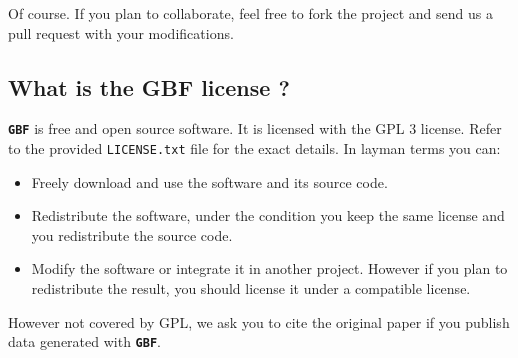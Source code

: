 \documentclass[10pt,a4paper]{article}
\begin{document}
Of course. If you plan to collaborate, feel free to fork the project
and send us a pull request with your modifications.

\subsection{What is the GBF license ?}
\label{sec-6-10}

\textbf{\texttt{\textsf{\color{namecolor}GBF}}} is free and open source software. It is licensed with the GPL 3
license. Refer to the provided \texttt{LICENSE.txt} file for the exact
details. In layman terms you can:

\begin{itemize}
\item Freely download and use the software and its source code.
\item Redistribute the software, under the condition you keep the same license and
you redistribute the source code.
\item Modify the software or integrate it in another project. However if
you plan to redistribute the result, you should license it under a
compatible license.
\end{itemize}

However not covered by GPL, we ask you to cite the original paper if
you publish data generated with \textbf{\texttt{\textsf{\color{namecolor}GBF}}}.
\end{document}
